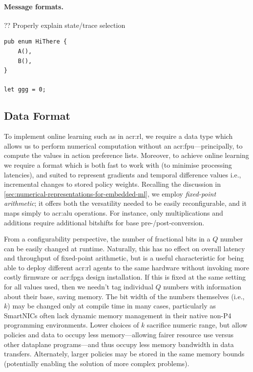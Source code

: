 \paragraph{Message formats.}
?? Properly explain state/trace selection

\begin{verbatim}
pub enum HiThere {
    A(),
    B(),
}

let ggg = 0;
\end{verbatim}

\subsection{Data Format}\label{sec:opal-data-format}
To implement online learning such as in \gls{acr:rl}, we require a data type which allows us to perform numerical computation without an \gls{acr:fpu}---principally, to compute the values in action preference lists.
Moreover, to achieve online learning we require a format which is both fast to work with (to minimise processing latencies), and suited to represent gradients and temporal difference values i.e., incremental changes to stored policy weights.
Recalling the discussion in \cref{sec:numerical-representations-for-embedded-ml}, we employ \emph{fixed-point arithmetic}; it offers both the versatility needed to be easily reconfigurable, and it maps simply to \gls{acr:alu} operations.
For instance, only multiplications and additions require additional bitshifts for base pre-/post-conversion.


From a configurability perspective, the number of fractional bits in a $Q$ number can be easily changed at runtime.
Naturally, this has no effect on overall latency and throughput of fixed-point arithmetic, but is a useful characteristic for being able to deploy different \gls{acr:rl} agents to the same hardware without invoking more costly firmware or \gls{acr:fpga} design installation.
If this is fixed at the same setting for all values used, then we needn't tag individual $Q$ numbers with information about their base, saving memory.
The bit width of the numbers themselves (i.e., $k$) may be changed only at compile time in many cases, particularly as SmartNICs often lack dynamic memory management in their native non-P4 programming environments.
Lower choices of $k$ sacrifice numeric range, but allow policies and data to occupy less memory---allowing fairer resource use versus other dataplane programs---and thus occupy less memory bandwidth in data transfers.
Alternately, larger policies may be stored in the same memory bounds (potentially enabling the solution of more complex problems).

